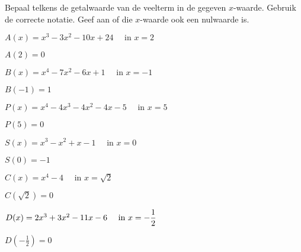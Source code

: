\documentclass{ximera}
\begin{document}
\begin{exercise}
	\renewcommand{\TJa }{\makebox[2.5cm]{nulwaarde}}
	\renewcommand{\TNee}{\makebox[2.5cm]{geen nulwaarde}}
		Bepaal telkens de getalwaarde van de veelterm in de gegeven $x$-waarde. Gebruik de correcte notatie. Geef aan of die $x$-waarde ook een nulwaarde is. 
		
		\begin{question} \( A(x) = x^3-3x^2-10x+24       \quad \text{ in }  x = 2               \)  \begin{uitwerking} \( A(2)=0                       \) \end{uitwerking} \end{question}
		\begin{question} \( B(x) = x^4-7x^2-6x+1         \quad \text{ in }  x = -1              \)  \begin{uitwerking} \( B(-1)=1                      \) \end{uitwerking} \end{question}
		\begin{question} \( P(x) = x^4-4x^3-4x^2-4x-5    \quad \text{ in }  x = 5               \)  \begin{uitwerking} \( P(5)=0                       \) \end{uitwerking} \end{question}
		\begin{question} \( S(x) = x^3-x^2+x-1           \quad \text{ in }  x = 0               \)  \begin{uitwerking} \( S(0)=-1                      \) \end{uitwerking} \end{question}
		\begin{question} \( C(x) = x^4-4                 \quad \text{ in }  x = \sqrt{2}        \)  \begin{uitwerking} \( C(\sqrt{2})=0                \) \end{uitwerking} \end{question}
		\begin{question} \( D(x) = 2x^3 + 3x^2 - 11x - 6 \quad \text{ in }  \displaystyle x = -\frac{1}{2} \)  \begin{uitwerking} \( D\left(-\frac{1}{2}\right)=0 \) \end{uitwerking} \end{question}
\end{exercise}
\end{document}
